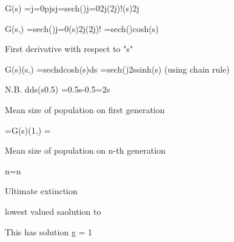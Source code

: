 G(s) =j=0pjsj=sech()j=02j(2j)!(s)2j   
 

G(s,) =sech()j=0(s)2j(2j)! =sech()cosh(s)  
 

First derivative with respect to "s"
 
G(s)(s,) =sechdcosh(s)ds =sech()2ssinh(s)   (using chain rule)
 
            N.B. dds(s0.5) =0.5s-0.5=2s
 
Mean size of population on first generation
 
=G(s)(1,) =  
 
Mean size of population on n-th generation
 
n=n  
 
Ultimate extinction
 
lowest valued saolution to 
 
This has solution g = 1
